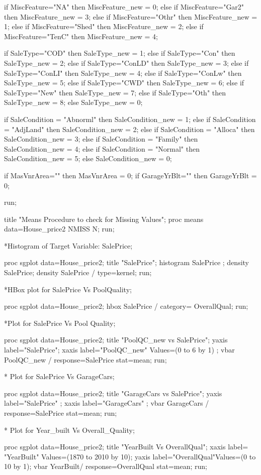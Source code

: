 		if MiscFeature="NA" then MiscFeature_new = 0;
		else if MiscFeature="Gar2" then MiscFeature_new = 3;
		else if MiscFeature="Othr" then MiscFeature_new = 1;
		else if MiscFeature="Shed" then MiscFeature_new = 2;
		else if MiscFeature="TenC" then MiscFeature_new = 4;

	
		if SaleType="COD" then SaleType_new = 1;
		else if SaleType="Con" then SaleType_new = 2;
		else if SaleType="ConLD" then SaleType_new = 3;
		else if SaleType="ConLI" then SaleType_new = 4;
		else if SaleType="ConLw" then SaleType_new = 5;
		else if SaleType="CWD" then SaleType_new = 6;
		else if SaleType="New" then SaleType_new = 7;
		else if SaleType="Oth" then SaleType_new = 8;
		else SaleType_new = 0;

		if SaleCondition = "Abnorml" then SaleCondition_new = 1;
		else if SaleCondition = "AdjLand" then SaleCondition_new = 2;
		else if SaleCondition = "Alloca" then SaleCondition_new = 3;
		else if SaleCondition = "Family" then SaleCondition_new = 4;
		else if SaleCondition = "Normal" then SaleCondition_new = 5;
		else SaleCondition_new = 0;

		if MasVnrArea="" then MasVnrArea = 0;
		if GarageYrBlt="" then GarageYrBlt = 0;

run;

title	"Means Procedure to check for Missing Values";
proc means data=House_price2 NMISS N; 
run;


*Histogram of Target Variable: SalePrice;

proc sgplot data=House_price2;
title "SalePrice";
histogram SalePrice ;
density SalePrice;
density SalePrice / type=kernel;
run;

*HBox plot for SalePrice Vs PoolQuality;

proc sgplot data=House_price2;
hbox SalePrice / category= OverallQual;
run;

*Plot for SalePrice Vs Pool Quality;

proc sgplot data=House_price2;
title "PoolQC_new vs SalePrice";
yaxis label="SalePrice";
xaxis label="PoolQC_new" Values=(0 to 6 by 1) ;
vbar PoolQC_new / response=SalePrice stat=mean; 
run;

* Plot for SalePrice Vs GarageCars;

proc sgplot data=House_price2;
title "GarageCars vs SalePrice";
yaxis label="SalePrice" ;
xaxis label="GarageCars" ;
vbar GarageCars / response=SalePrice stat=mean; 
run;

* Plot for Year_built Vs Overall_Quality;

proc sgplot data=House_price2;
title "YearBuilt Vs OverallQual";
xaxis label= "YearBuilt" Values=(1870 to 2010 by 10);
yaxis label="OverallQual"Values=(0 to 10 by 1);
vbar   YearBuilt/ response=OverallQual stat=mean; 
run;

